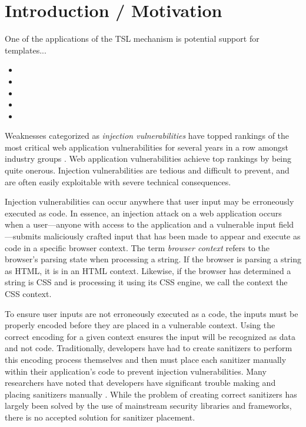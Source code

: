 
\section{Introduction / Motivation}

One of the applications of the TSL mechanism is potential support for templates...
\begin{itemize}
\item {}
\item {}
\item {}
\item {}
\item {}
\end{itemize}


Weaknesses categorized as \emph{injection vulnerabilities} have topped
rankings of the most critical web application vulnerabilities for
several years in a row amongst industry groups \cite{owasp, cwsans}.
Web application vulnerabilities achieve top rankings by being quite
onerous. Injection vulnerabilities are tedious and
difficult to prevent, and are often easily exploitable with
severe technical consequences.


Injection vulnerabilities can occur anywhere that user input may be erroneously
executed as code. In essence, an injection attack on a web application
occurs when a user---anyone with access to the application and a
vulnerable input field---submits maliciously crafted input that has
been made to appear and execute as code in a specific browser context.
The term \emph{browser context} refers to the browser's parsing state
when processing a string. If the browser is parsing a string as HTML,
it is in an HTML context. Likewise, if the browser has determined
a string is CSS and is processing it using its CSS engine, we call
the context the CSS context.

To ensure user inputs are not erroneously executed as a code, the inputs
must be properly encoded before they are placed in a vulnerable context. Using 
the correct encoding for a given context ensures the input will be recognized as 
data and not code. Traditionally, developers have had to create sanitizers to perform 
this encoding process themselves and then must place each sanitizer manually within
their application's code to prevent injection vulnerabilities. Many researchers have
noted that developers have significant trouble making and placing sanitizers manually . While the problem of creating correct sanitizers has largely been solved by the use of mainstream security libraries and frameworks, there is no accepted solution for sanitizer placement.

